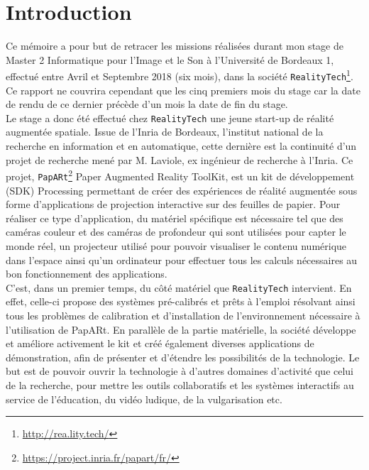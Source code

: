 \chapter{Introduction}
\label{chap:intro}

Ce mémoire a pour but de retracer les missions réalisées durant mon stage de Master 2 Informatique pour l'Image et le Son à l'Université de Bordeaux 1, effectué entre Avril et Septembre 2018 (six mois), dans la société \texttt{RealityTech}\footnote{\href{http://rea.lity.tech/}{http://rea.lity.tech/}}. Ce rapport ne couvrira cependant que les cinq premiers mois du stage car la date de rendu de ce dernier précède d'un mois la date de fin du stage.\\

Le stage a donc été effectué chez \texttt{RealityTech} une jeune start-up de réalité augmentée spatiale. Issue de l'Inria de Bordeaux, l'institut national de la recherche en information et en automatique, cette dernière est la continuité d'un projet de recherche mené par M. Laviole, ex ingénieur de recherche à l'Inria. Ce projet, \texttt{PapARt}\footnote{\href{https://project.inria.fr/papart/fr/}{https://project.inria.fr/papart/fr/}} Paper Augmented Reality ToolKit, est un kit de développement (SDK) Processing permettant de créer des expériences de réalité augmentée sous forme d'applications de projection interactive sur des feuilles de papier. Pour réaliser ce type d'application, du matériel spécifique est nécessaire tel que des caméras couleur et des caméras de profondeur qui sont utilisées pour capter le monde réel, un projecteur utilisé pour pouvoir visualiser le contenu numérique dans l'espace ainsi qu'un ordinateur pour effectuer tous les calculs nécessaires au bon fonctionnement des applications.\\

C'est, dans un premier temps, du côté matériel que \texttt{RealityTech} intervient. En effet, celle-ci propose des systèmes pré-calibrés et prêts à l'emploi résolvant ainsi tous les problèmes de calibration et d'installation de l'environnement nécessaire à l'utilisation de PapARt. En parallèle de la partie matérielle, la société développe et améliore activement le kit et créé également diverses applications de démonstration, afin de présenter et d'étendre les possibilités de la technologie. Le but est de pouvoir ouvrir la technologie à d'autres domaines d'activité que celui de la recherche, pour mettre les outils collaboratifs et les systèmes interactifs au service de l'éducation, du vidéo ludique, de la vulgarisation etc.

